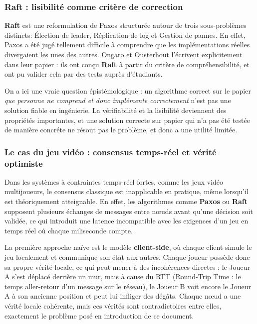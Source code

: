 \documentclass[12pt,a4paper]{article}
\begin{document}
\subsubsection{Raft : lisibilité comme critère de correction}
\textbf{Raft}\cite{Raft2014} est une reformulation de Paxos structurée autour de trois sous-problèmes distincts: Élection de leader, Réplication de log et Gestion de pannes. En effet, Paxos a été jugé tellement difficile à comprendre que les implémentations réelles divergaient les unes des autres. Ongaro et Ousterhout l'écrivent explicitement dans leur papier : ils ont conçu \textbf{Raft}\cite{Raft2014} à partir du critère de compréhensibilité, et ont pu valider cela par des tests auprès d'étudiants.

\vspace{0.25cm}

On a ici une vraie question épistémologique : un algorithme correct sur le papier \textit{que personne ne comprend et donc implémente correctement} n'est pas une solution fiable en ingénierie. La vérifiabilité et la lisibilité deviennent des propriétés importantes, et une solution correcte sur papier qui n'a pas été testée de manière concréte ne résout pas le problème, et donc a une utilité limitée.

\subsubsection{Le cas du jeu vidéo : consensus temps-réel et vérité optimiste}

Dans les systèmes à contraintes temps-réel fortes, comme les jeux vidéo multijoueurs, le consensus classique est inapplicable en pratique, même lorsqu'il est théoriquement atteignable. En effet, les algorithmes comme \textbf{Paxos} ou \textbf{Raft} supposent plusieurs échanges de messages entre nœuds avant qu'une décision soit validée, ce qui introduit une latence incompatible avec les exigences d'un jeu en temps réel où chaque miliseconde compte.

\vspace{0.25cm}

La première approche naïve est le modèle \textbf{client-side}, où chaque client simule le jeu localement et communique son état aux autres. Chaque joueur possède donc sa propre vérité locale, ce qui peut mener à des incohérences directes : le Joueur A s'est déplacé derrière un mur, mais à cause du RTT (Round-Trip Time : le temps aller-retour d'un message sur le réseau), le Joueur B voit encore le Joueur A à son ancienne position et peut lui infliger des dégâts. Chaque nœud a une vérité locale cohérente, mais ces vérités sont contradictoires entre elles, exactement le problème posé en introduction de ce document.
\end{document}
